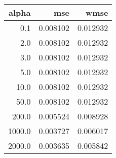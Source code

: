 \begin{tabular}{rrr}
\toprule
 alpha &      mse &     wmse \\
\midrule
   0.1 & 0.008102 & 0.012932 \\
   2.0 & 0.008102 & 0.012932 \\
   3.0 & 0.008102 & 0.012932 \\
   5.0 & 0.008102 & 0.012932 \\
  10.0 & 0.008102 & 0.012932 \\
  50.0 & 0.008102 & 0.012932 \\
 200.0 & 0.005524 & 0.008928 \\
1000.0 & 0.003727 & 0.006017 \\
2000.0 & 0.003635 & 0.005842 \\
\bottomrule
\end{tabular}

